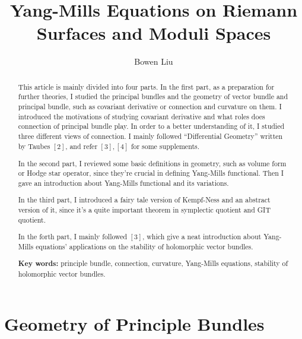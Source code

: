 \documentclass[11pt]{amsart}
\numberwithin{equation}{section}
\theoremstyle{plain}
\theoremstyle{plain}
\numberwithin{equation}{section}
\begin{document}
\date{}

\title
{Yang-Mills Equations on Riemann Surfaces and Moduli Spaces}

\author{Bowen Liu}
\address{School of Mathematics, Shandong University\\
Jinan, 250100\\ P.R. China\\} 

\begin{abstract}
This article is mainly divided into four parts. In the first part, as a preparation for further theories, I studied the principal bundles and the geometry of vector bundle and principal bundle, such as covariant derivative or connection and curvature on them. I introduced the motivations of studying covariant derivative and what roles does connection of principal bundle play. In order to a better understanding of it, I studied three different views of connection. I mainly followed “Differential Geometry” written by Taubes $[2]$, and refer $[3],[4]$ for some supplements.

In the second part, I reviewed some basic definitions in geometry, such as volume form or Hodge star operator, since they're crucial in defining Yang-Mills functional. Then I gave an introduction about Yang-Mills functional and its variations.

In the third part, I introduced a fairy tale version of Kempf-Ness and an abstract version of it, since it's a quite important theorem in symplectic quotient and GIT quotient.

In the forth part, I mainly followed $[3]$, which give a neat introduction about Yang-Mills equations' applications on the stability of holomorphic vector bundles. 

\textbf{Key words:} principle bundle, connection, curvature, Yang-Mills equations, stability of holomorphic vector bundles.
\end{abstract}

\maketitle
\tableofcontents
\newpage


\section{Geometry of Principle Bundles}
\end{document}
